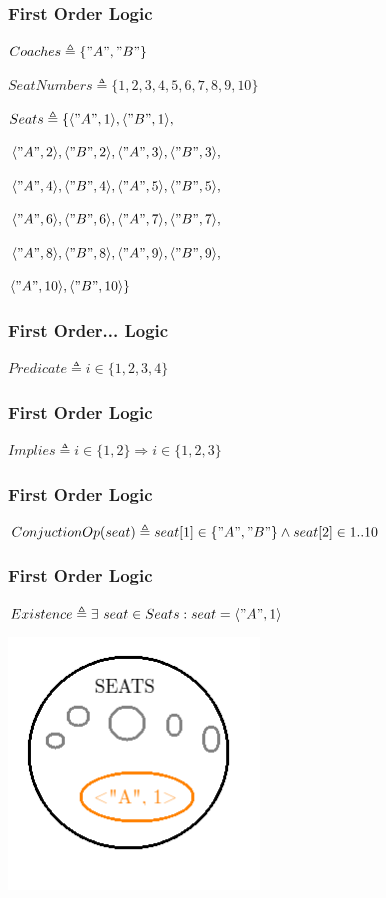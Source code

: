 \documentclass{beamer}
\begin{document}
\begin{frame}
  \frametitle{First Order Logic}
  $Coaches \triangleq \{"A", "B"\}$

  $SeatNumbers \triangleq \{1, 2, 3, 4, 5, 6, 7, 8, 9, 10\}$

  $Seats \triangleq \{\langle"A", 1\rangle, \langle"B", 1\rangle,$
  
  $\langle"A", 2\rangle, \langle"B", 2\rangle,\langle"A", 3\rangle, \langle"B", 3\rangle,$
  
  $\langle"A", 4\rangle, \langle"B", 4\rangle,\langle"A", 5\rangle, \langle"B", 5\rangle,$
  
  $\langle"A", 6\rangle, \langle"B", 6\rangle,\langle"A", 7\rangle, \langle"B", 7\rangle,$
  
  $\langle"A", 8\rangle, \langle"B", 8\rangle,\langle"A", 9\rangle, \langle"B", 9\rangle,$
  
  $\langle"A", 10\rangle, \langle"B", 10\rangle \}$
\end{frame}

\begin{frame}
  \frametitle{First Order... Logic}
  $Predicate \triangleq i \in \{1, 2, 3, 4\}$
\end{frame}

\begin{frame}
  \frametitle{First Order Logic}

  $Implies \triangleq i \in \{1, 2\} \Rightarrow i \in \{1, 2, 3\}$
\end{frame}

\begin{frame}
  \frametitle{First Order Logic}
  $ConjuctionOp(seat) \triangleq seat[1] \in \{"A", "B"\} \land seat[2] \in 1..10$
\end{frame}

\begin{frame}
  \frametitle{First Order Logic}

  $Existence \triangleq \exists\ seat \in Seats : seat = \langle"A", 1\rangle$
  
  \begin{center}
    \includegraphics[width=0.5\textwidth]{tla-introduction/exists}
  \end{center}
\end{frame}
\end{document}
